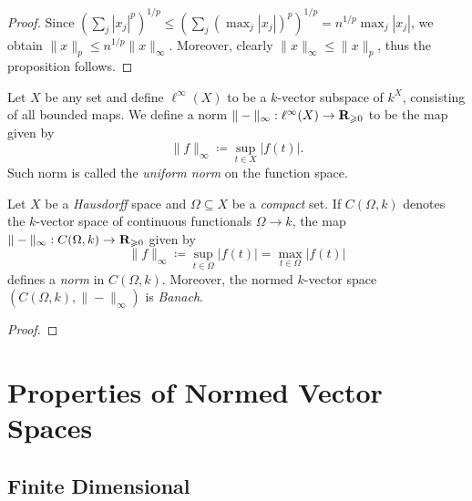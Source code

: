 \begin{proof}
    Since \((\sum_j |x_j|^p)^{1/p} \leq (\sum_j (\max_j |x_j|)^p)^{1/p} = n^{1/p}
    \max_j |x_j|\), we obtain \(\| x \|_p \leq n^{1/p} \| x \|_{\infty}\). Moreover,
    clearly \(\| x \|_{\infty} \leq \| x \|_p\), thus the proposition follows.
\end{proof}

\begin{example}
    \label{exp:ell-infty-space-maps}
    Let \(X\) be any set and define \(\ell^{\infty}(X)\) to be a \(k\)-vector
    subspace of \(k^X\), consisting of all bounded maps. We define a norm
    \(\| - \|_{\infty}: \ell^{\infty}(X) \to \mathbf{R}_{\geqslant 0}\) to be the map given by
    \[
        \| f \|_{\infty} \coloneq \sup_{t \in X} |f(t)|.
    \]
    Such norm is called the \emph{uniform norm} on the function space.
\end{example}

\begin{example}
    \label{exp:uniform-convergence-norm}
    Let \(X\) be a \emph{Hausdorff} space and \(\Omega \subseteq X\) be a
    \emph{compact} set. If \(C(\Omega, k)\) denotes the \(k\)-vector space of
    continuous functionals \(\Omega \to k\), the map \(\| - \|_{\infty}: C(\Omega,
    k) \to \mathbf{R}_{\geqslant 0}\) given by
    \[
        \| f \|_{\infty} \coloneq \sup_{t \in \Omega} |f(t)| = \max_{t \in \Omega} |f(t)|
    \]
    defines a \emph{norm} in \(C(\Omega, k)\). Moreover, the normed \(k\)-vector
    space \((C(\Omega, k), \| - \|_{\infty})\) is \emph{Banach}.
\end{example}

\begin{proof}
\end{proof}


\section{Properties of Normed Vector Spaces}

\subsection{Finite Dimensional}

